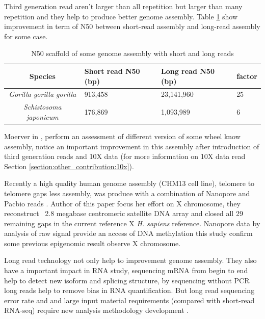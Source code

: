 \documentclass[main]{subfiles}
\begin{document}
Third generation read aren't larger than all repetition but larger than many repetition and they help to produce better genome assembly. Table \ref{intro:tab:sr_lr_assembly} show improvement in term of N50 between short-read assembly and long-read assembly for some case. 

\begin{table}[]
    \centering
    \begin{tabular}{c|lll}
        Species & Short read N50 (bp) & Long read N50 (bp) & factor \\ \hline
        \textit{Gorilla gorilla gorilla} & 913,458 \cite{gorilla_sr_assembly} & 23,141,960 \cite{gorilla_genome} & 25 \\
        \textit{Schistosoma japonicum} & 176,869 \cite{s_japonicum_sr_assembly} & 1,093,989 \cite{s_japonicum_3rd_gene_improvement} & 6 \\
    \end{tabular}
    \caption{N50 scaffold of some genome assembly with short and long reads}
    \label{intro:tab:sr_lr_assembly}
\end{table}

Moerver \citeauthor{dnAQET} in \cite{dnAQET}, perform an assessment of different version of some wheel know assembly, \citeauthor{dnAQET} notice an important improvement in this assembly after introduction of third generation reads and 10X data (for more information on 10X data read Section \ref{section:other_contribution:10x}).

Recently a high quality human genome assembly (CHM13 cell line), telomere to telomere gaps less assembly, was produce with a combination of Nanopore and Pacbio reads \cite{telomere2telomere}. Author of this paper focus her effort on X chromosome, they reconstruct ~2.8 megabase centromeric satellite DNA array and closed all 29 remaining gaps in the current reference X \textit{H. sapiens} reference. Nanopore data by analysis of raw signal provide an access of DNA methylation this study confirm some previous epigenomic result observe X chromosome.

Long read technology not only help to improvement genome assembly. They also have a important impact in RNA study, sequencing mRNA from begin to end help to detect new isoform and splicing structure, by sequencing without PCR long reads help to remove bias in RNA quantification. But long read sequencing error rate and and large input material requirements (compared with short-read RNA-seq) require new analysis methodology development \cite{review_lr_rna}. 
\end{document}
